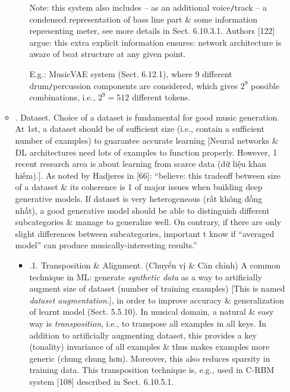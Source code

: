 \documentclass{article}
\begin{document}
\begin{itemize}
\begin{itemize}
\begin{itemize}
			Note: this system also includes -- as an additional voice{\tt/}track -- a condensed representation of bass line part \& some information representing meter, see more details in Sect. 6.10.3.1. Authors [122] argue: this extra explicit information ensures: network architecture is aware of beat structure at any given point.

			E.g.: MusicVAE system (Sect. 6.12.1), where 9 different drum{\tt/}percussion components are considered, which gives $2^9$ possible combinations, i.e., $2^9 = 512$ different tokens.
		\end{itemize}
		\item {. Dataset.} Choice of a dataset is fundamental for good music generation. At 1st, a dataset should be of sufficient size (i.e., contain a sufficient number of examples) to guarantee accurate learning [Neural networks \& DL architectures need lots of examples to function properly. However, 1 recent research area is about learning from scarce data (dữ liệu khan hiếm).]. As noted by Hadjeres in [66]: ``believe: this tradeoff between size of a dataset \& its coherence is 1 of major issues when building deep generative models. If dataset is very heterogeneous (rất không đồng nhất), a good generative model should be able to distinguish different subcategories \& manage to generalize well. On contrary, if there are only slight differences between subcategories, important t know if ``averaged model'' can produce musically-interesting results.''
		\begin{itemize}
			\item {.1. Transposition \& Alignment.} (Chuyển vị \& Căn chỉnh) A common technique in ML: generate {\it synthetic data} as a way to artificially augment size of dataset (number of training examples) [This is named {\it dataset augmentation}.], in order to improve accuracy \& generalization of learnt model (Sect. 5.5.10). In musical domain, a natural \& easy way is {\it transposition}, i.e., to transpose all examples in all keys. In addition to artificially augmenting dataset, this  provides a key (tonality) invariance of all examples \& thus makes examples more generic (chung chung hơn). Moreover, this also reduces sparsity in training data. This transposition technique is, e.g., used in C-RBM system [108] described in Sect. 6.10.5.1.


\end{itemize}
\end{itemize}
\end{itemize}
\end{document}
